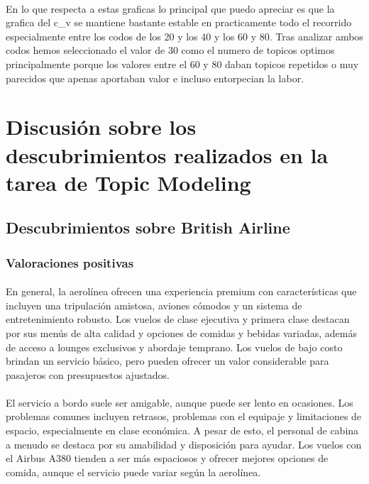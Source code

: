 \documentclass{report}
\begin{document}
{                    \paragraph*{}
                    {
                        En lo que respecta a estas graficas lo principal que puedo apreciar es que la grafica del c\_v se mantiene bastante estable en practicamente todo el recorrido especialmente entre los codos de los 20 y los 40 y los 60 y 80.
                        Tras analizar ambos codos hemos seleccionado el valor de 30 como el numero de topicos optimos principalmente porque los valores entre el 60 y 80 daban topicos repetidos o muy parecidos que apenas aportaban valor e incluso entorpecian la labor.
                    }            
        \clearpage\section{Discusión sobre los descubrimientos realizados en la tarea de Topic Modeling}
            \subsection{Descubrimientos sobre British Airline}
                \subsubsection*{Valoraciones positivas}
                    \paragraph*{}{
                        En general, la aerolínea ofrecen una experiencia premium con características que incluyen una tripulación amistosa, aviones cómodos y un sistema de entretenimiento robusto. Los vuelos de clase ejecutiva y primera clase destacan por sus menús de alta calidad y opciones de comidas y bebidas variadas, además de acceso a lounges exclusivos y abordaje temprano. Los vuelos de bajo costo brindan un servicio básico, pero pueden ofrecer un valor considerable para pasajeros con presupuestos ajustados.
                    }
                    \paragraph*{}{
                        El servicio a bordo suele ser amigable, aunque puede ser lento en ocasiones. Los problemas comunes incluyen retrasos, problemas con el equipaje y limitaciones de espacio, especialmente en clase económica. A pesar de esto, el personal de cabina a menudo se destaca por su amabilidad y disposición para ayudar. Los vuelos con el Airbus A380 tienden a ser más espaciosos y ofrecer mejores opciones de comida, aunque el servicio puede variar según la aerolínea.
                    }
}
\end{document}
